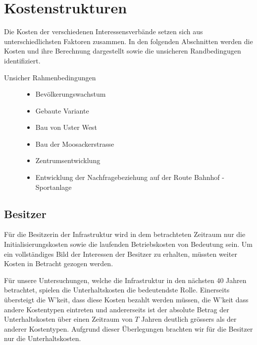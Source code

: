 %
%
%
%

\chapter{Kostenstrukturen}
\label{chap:Kosten}

Die Kosten der verschiedenen Interessensverbände setzen sich aus unterschiedlichsten Faktoren zusammen. In den folgenden Abschnitten werden die Kosten und ihre Berechnung dargestellt sowie die unsicheren Randbedingugen identifiziert. 

\begin{description}
\item[Unsicher Rahmenbedingungen]\hfill %
\begin{itemize}
\item Bevölkerungswachstum
\item Gebaute Variante
\item Bau von Uster West
\item Bau der Moosackerstrasse
\item Zentrumsentwicklung
\item Entwicklung der Nachfragebeziehung auf der Route Bahnhof - Sportanlage
\end{itemize}
\end{description}


\section{Besitzer}

Für die Besitzerin der Infrastruktur wird in dem betrachteten Zeitraum nur die Initialisierungskosten sowie die laufenden Betriebskosten von Bedeutung sein. Um ein vollständiges Bild der Interessen der Besitzer zu erhalten, müssten weiter Kosten in Betracht gezogen werden. 

Für unsere Untersuchungen, welche die Infrastruktur in den nächsten 40 Jahren betrachtet, spielen die Unterhaltskosten die bedeutendste Rolle. Einerseits übersteigt die W'keit, dass diese Kosten bezahlt werden müssen, die W'keit dass andere Kostentypen eintreten und andererseits ist der absolute Betrag der Unterhaltskosten über einen Zeitraum von $T$ Jahren deutlich grössers als der anderer Kostentypen. Aufgrund dieser Überlegungen brachten wir für die Besitzer nur die Unterhaltskosten. 


